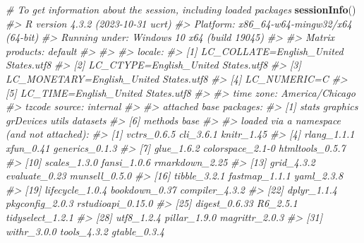 \documentclass[
]{book}
\newenvironment{Shaded}{\begin{snugshade}}{\end{snugshade}}
\newcommand{\CommentTok}[1]{\textcolor[rgb]{0.56,0.35,0.01}{\textit{#1}}}
\newcommand{\FunctionTok}[1]{\textcolor[rgb]{0.13,0.29,0.53}{\textbf{#1}}}
\newcommand{\NormalTok}[1]{#1}
\begin{document}
\begin{Shaded}
\begin{Highlighting}[]
\CommentTok{\# To get information about the session, including loaded packages}
\FunctionTok{sessionInfo}\NormalTok{()}
\CommentTok{\#\textgreater{} R version 4.3.2 (2023{-}10{-}31 ucrt)}
\CommentTok{\#\textgreater{} Platform: x86\_64{-}w64{-}mingw32/x64 (64{-}bit)}
\CommentTok{\#\textgreater{} Running under: Windows 10 x64 (build 19045)}
\CommentTok{\#\textgreater{} }
\CommentTok{\#\textgreater{} Matrix products: default}
\CommentTok{\#\textgreater{} }
\CommentTok{\#\textgreater{} }
\CommentTok{\#\textgreater{} locale:}
\CommentTok{\#\textgreater{} [1] LC\_COLLATE=English\_United States.utf8 }
\CommentTok{\#\textgreater{} [2] LC\_CTYPE=English\_United States.utf8   }
\CommentTok{\#\textgreater{} [3] LC\_MONETARY=English\_United States.utf8}
\CommentTok{\#\textgreater{} [4] LC\_NUMERIC=C                          }
\CommentTok{\#\textgreater{} [5] LC\_TIME=English\_United States.utf8    }
\CommentTok{\#\textgreater{} }
\CommentTok{\#\textgreater{} time zone: America/Chicago}
\CommentTok{\#\textgreater{} tzcode source: internal}
\CommentTok{\#\textgreater{} }
\CommentTok{\#\textgreater{} attached base packages:}
\CommentTok{\#\textgreater{} [1] stats     graphics  grDevices utils     datasets }
\CommentTok{\#\textgreater{} [6] methods   base     }
\CommentTok{\#\textgreater{} }
\CommentTok{\#\textgreater{} loaded via a namespace (and not attached):}
\CommentTok{\#\textgreater{}  [1] vctrs\_0.6.5       cli\_3.6.1         knitr\_1.45       }
\CommentTok{\#\textgreater{}  [4] rlang\_1.1.1       xfun\_0.41         generics\_0.1.3   }
\CommentTok{\#\textgreater{}  [7] glue\_1.6.2        colorspace\_2.1{-}0  htmltools\_0.5.7  }
\CommentTok{\#\textgreater{} [10] scales\_1.3.0      fansi\_1.0.6       rmarkdown\_2.25   }
\CommentTok{\#\textgreater{} [13] grid\_4.3.2        evaluate\_0.23     munsell\_0.5.0    }
\CommentTok{\#\textgreater{} [16] tibble\_3.2.1      fastmap\_1.1.1     yaml\_2.3.8       }
\CommentTok{\#\textgreater{} [19] lifecycle\_1.0.4   bookdown\_0.37     compiler\_4.3.2   }
\CommentTok{\#\textgreater{} [22] dplyr\_1.1.4       pkgconfig\_2.0.3   rstudioapi\_0.15.0}
\CommentTok{\#\textgreater{} [25] digest\_0.6.33     R6\_2.5.1          tidyselect\_1.2.1 }
\CommentTok{\#\textgreater{} [28] utf8\_1.2.4        pillar\_1.9.0      magrittr\_2.0.3   }
\CommentTok{\#\textgreater{} [31] withr\_3.0.0       tools\_4.3.2       gtable\_0.3.4}
\end{Highlighting}
\end{Shaded}
\end{document}
